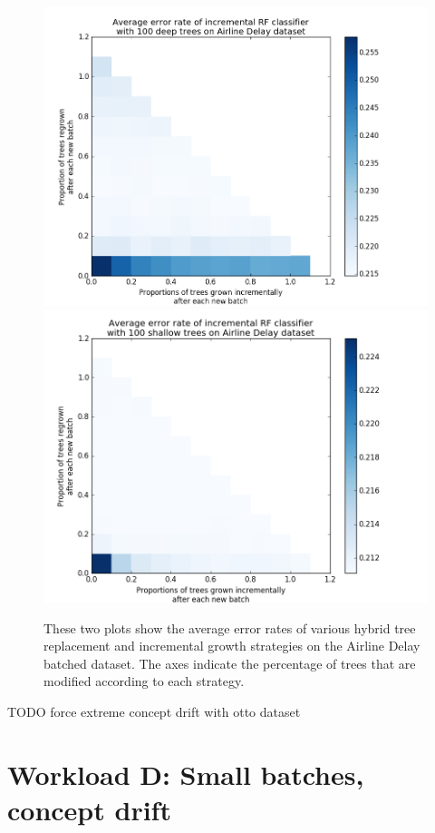 \begin{figure}
  \centering
  \includegraphics[width=5in]{planedeep}
  \includegraphics[width=5in]{planeshallow}
  \caption{These two plots show the average error rates of various hybrid tree
  replacement and incremental growth strategies on the Airline Delay batched
dataset. The axes indicate the percentage of trees that are modified according
to each strategy.}
  \label{fig:planehybrid}
\end{figure}
 
TODO force extreme concept drift with otto dataset



\section{Workload D: Small batches, concept drift}



